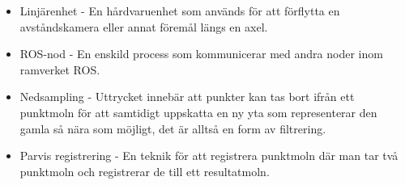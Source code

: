 \begin{itemize}
	\item Linjärenhet - En hårdvaruenhet som används för att förflytta en avståndskamera eller annat föremål längs en axel.
	\item ROS-nod - En enskild process som kommunicerar med andra noder inom ramverket ROS.
	\item Nedsampling - Uttrycket innebär att punkter kan tas bort ifrån ett punktmoln för att samtidigt uppskatta en ny yta som representerar den gamla så nära som möjligt, det är alltså en form av filtrering.
	\item Parvis registrering - En teknik för att registrera punktmoln där man tar två punktmoln och registrerar de till ett resultatmoln.
\end{itemize} 


